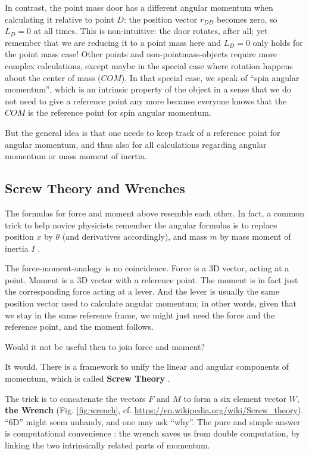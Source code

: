 \documentclass[10pt,a4paper]{article}
\begin{document}
In contrast, the point mass door has a different angular momentum when calculating it relative to point \(D\): the position vector \(r_{DD}\) becomes zero, so \(L_{D} = 0\) at all times.
This is non-intuitive: the door rotates, after all; yet remember that we are reducing it to a point mass here and \(L_{D} = 0\) only holds for the point mass case!
Other points and non-pointmass-objects require more complex calculations, except maybe in the special case where rotation happens about the center of mass (\(COM\)).
In that special case, we speak of ``spin angular momentum'', which is an intrinsic property of the object in a sense that we do not need to give a reference point any more because everyone knows that the \(COM\) is the reference point for spin angular momentum.


But the general idea is that one needs to keep track of a reference point for angular momentum, and thus also for all calculations regarding angular momentum or mass moment of inertia.


\FloatBarrier
\subsection{Screw Theory and Wrenches}
\label{sec:org5762746}

The formulas for force and moment above resemble each other.
In fact, a common trick to help novice physicists remember the angular formulas is to replace position \(x\) by \(\theta\) (and derivatives accordingly), and mass \(m\) by mass moment of inertia \(I\) \citep{Tipler2007}.

The force-moment-analogy is no coincidence.
Force is a 3D vector, acting at a point.
Moment is a 3D vector with a reference point.
The moment is in fact just the corresponding force acting at a lever.
And the lever is usually the same position vector used to calculate angular momentum; in other words, given that we stay in the same reference frame, we might just need the force and the reference point, and the moment follows.

Would it not be useful then to join force and moment?


It would.
There is a framework to unify the linear and angular components of momentum, which is called \textbf{Screw Theory} \citep{Ball1876,Lynch2017}.

The trick is to concatenate the vectors \(F\) and \(M\) to form a six element vector \(W\), \textbf{the Wrench} (Fig. \ref{fig:wrench}, cf. \url{https://en.wikipedia.org/wiki/Screw\_theory}).
``6D'' might seem unhandy, and one may ask ``why''.
The pure and simple answer is computational convenience \citep{Dumas2004,Mueller2018}: the wrench saves us from double computation, by linking the two intrinsically related parts of momentum.
\end{document}
